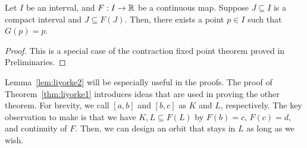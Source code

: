 \documentclass[12pt,draft,twoside]{book}
\begin{document}
\begin{lemma}
  Let $I$ be an interval, and $F: I\to \mathbb{R}$ be a continuous map.
  Suppose $J \subseteq I$ is a compact interval and $J \subseteq F(J)$. 
  Then, there exists a point $p \in I$ such that $G(p) = p$.
  \begin{proof}
    This is a special case of the contraction fixed point theorem proved in Preliminaries.
  \end{proof}
  \label{lem:liyorke3}
\end{lemma}

Lemma~\ref{lem:liyorke2} will be especially useful in the proofs.
The proof of Theorem~\ref{thm:liyorke1} introduces ideas that are used in proving the other theorem.
For brevity, we call $[a,b]$ and $[b,c]$ as $K$ and $L$, respectively.
The key observation to make is that we have $K,L \subseteq F(L)$ by $F(b) = c$, $F(c) = d$, and continuity of $F$.
Then, we can design an orbit that stays in $L$ as long as we wish.
\end{document}
